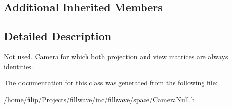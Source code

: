 \subsection*{Additional Inherited Members}


\subsection{Detailed Description}
Not used. Camera for which both projection and view matrices are always identities. 

The documentation for this class was generated from the following file\+:\begin{DoxyCompactItemize}
\item 
/home/filip/\+Projects/fillwave/inc/fillwave/space/Camera\+Null.\+h\end{DoxyCompactItemize}

